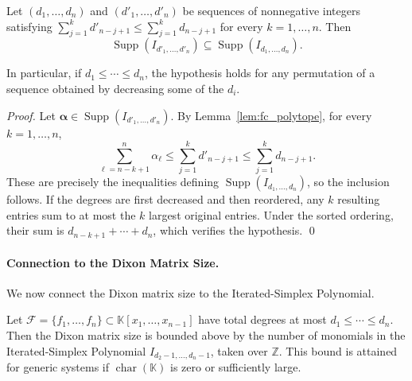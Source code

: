 \begin{lemma}\label{lem:reorder_support}
Let $(d_1,\ldots,d_n)$ and $(d'_1,\ldots,d'_n)$ be sequences of nonnegative integers satisfying $\sum_{j=1}^{k} d'_{n-j+1} \leq \sum_{j=1}^{k} d_{n-j+1}$ for every $k=1,\ldots,n$. Then
\[
\operatorname{Supp}(I_{d'_1,\ldots,d'_n}) \subseteq \operatorname{Supp}(I_{d_1,\ldots,d_n}).
\]

In particular, if $d_1\leq\cdots\leq d_n$, the hypothesis holds for any permutation of a sequence obtained by decreasing some of the $d_i$.
\end{lemma}

\begin{proof}
Let $\boldsymbol\alpha\in\operatorname{Supp}(I_{d'_1,\ldots,d'_n})$. By Lemma~\ref{lem:fc_polytope}, for every $k=1,\ldots,n$,
\[
\sum_{\ell=n-k+1}^{n}\alpha_\ell
\le \sum_{j=1}^{k}d'_{n-j+1}
\le \sum_{j=1}^{k}d_{n-j+1}.
\]
These are precisely the inequalities defining $\operatorname{Supp}(I_{d_1,\ldots,d_n})$, so the inclusion follows. If the degrees are first decreased and then reordered, any $k$ resulting entries sum to at most the $k$ largest original entries. Under the sorted ordering, their sum is $d_{n-k+1}+\cdots+d_n$, which verifies the hypothesis.
\qed
\end{proof}


\paragraph{Connection to the Dixon Matrix Size.}
We now connect the Dixon matrix size to the Iterated-Simplex Polynomial.

\begin{lemma}\label{lem:dixon_fc_bound}
Let $\mathcal F=\{f_1,\ldots,f_n\}\subset\mathbb K[x_1,\ldots,x_{n-1}]$ have total degrees at most $d_1\le\cdots\le d_n$. Then the Dixon matrix size is bounded above by the number of monomials in the Iterated-Simplex Polynomial $I_{d_2-1,\ldots,d_n-1}$, taken over $\mathbb Z$. This bound is attained for generic systems if $\operatorname{char}(\mathbb K)$ is zero or sufficiently large.
\end{lemma}

